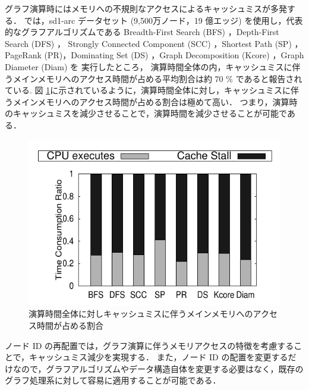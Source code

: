 グラフ演算時にはメモリへの不規則なアクセスによるキャッシュミスが多発する．\cite{wei2016speedup} では，sd1-arc データセット (9,500万ノード，19 億エッジ)
を使用し，代表的なグラフアルゴリズムである 
Breadth-First Search (BFS) \cite{cormen2009introduction}，Depth-First Search (DFS) \cite{cormen2009introduction}，
Strongly Connected Component (SCC) \cite{sharir1981strong}，Shortest Path (SP) \cite{cormen2009introduction}，
PageRank (PR)，Dominating Set (DS) \cite{cockayne1978domination}，Graph Decomposition (Kcore) \cite{batagelj2003m}，Graph Diameter (Diam) を
実行したところ， 演算時間全体の内，キャッシュミスに伴うメインメモリへのアクセス時間が占める平均割合は約 70 \% であると報告されている.
図 \ref{cache_miss_ratio}に示されているように，演算時間全体に対し，キャッシュミスに伴うメインメモリへのアクセス時間が占める割合は極めて高い．
つまり，演算時のキャッシュミスを減少させることで，演算時間を減少させることが可能である．
\begin{figure}[t]
  \centering
  \includegraphics[scale=1.0]{./figure/cache_miss.pdf}
  \caption{演算時間全体に対しキャッシュミスに伴うメインメモリへのアクセス時間が占める割合}
  \label{cache_miss_ratio}
\end{figure}

ノード ID の再配置では，グラフ演算に伴うメモリアクセスの特徴を考慮することで，キャッシュミス減少を実現する．
また，ノード ID の配置を変更するだけなので，グラフアルゴリズムやデータ構造自体を変更する必要はなく，既存のグラフ処理系に対して容易に適用することが可能である．

